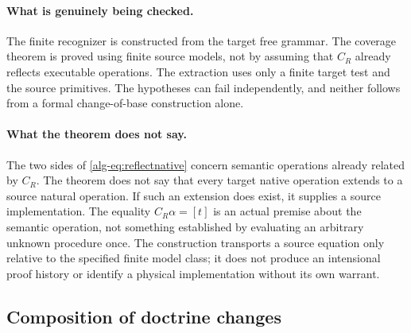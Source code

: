 \documentclass[11pt]{article}
\theoremstyle{definition}
\theoremstyle{remark}
\begin{document}
\paragraph{What is genuinely being checked.}
The finite recognizer is constructed from the target free grammar. The
coverage theorem is proved using finite source models, not by assuming
that $C_R$ already reflects executable operations. The extraction uses
only a finite target test and the source primitives. The hypotheses can
fail independently, and neither follows from a formal change-of-base
construction alone.

\paragraph{What the theorem does not say.}
The two sides of \eqref{alg-eq:reflectnative} concern semantic operations
already related by $C_R$. The theorem does not say that every target
native operation extends to a source natural operation. If such an
extension does exist, it supplies a source implementation. The equality
$C_R\alpha=[t]$ is an actual premise about the semantic operation, not
something established by evaluating an arbitrary unknown procedure once.
The construction transports a source equation only relative to the
specified finite model class; it does not produce an intensional proof
history or identify a physical implementation without its own warrant.

\subsection{Composition of doctrine changes}
\end{document}
